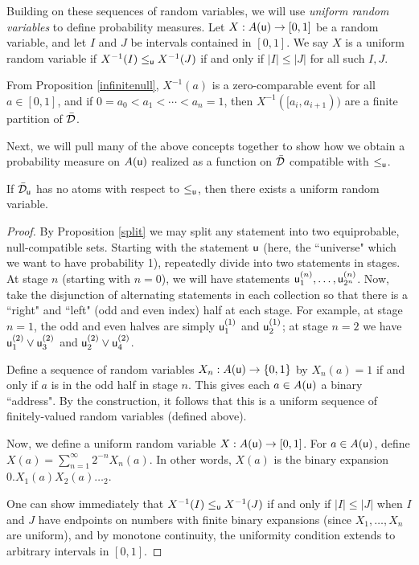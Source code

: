 \documentclass[10pt, onecolumn, longbibliography, nofootinbib]{revtex4-2}
\begin{document}
Building on these sequences of random variables, we will use \emph{uniform random variables} to define probability measures. Let $X:A({\stmt[u]})\to[0,1]$ be a random variable, and let $I$ and $J$ be intervals contained in $[0,1]$. We say $X$ is a uniform random variable if $X^{-1}(I)\lequ X^{-1}(J)$ if and only if $|I|\leq|J|$ for all such $I,J$. 

From Proposition \ref{infinitenull}, $X^{-1}(a)$ is a zero-comparable event for all $a\in[0,1]$, and if $0=a_0<a_1<\cdots<a_n=1$, then $X^{-1}([a_i,a_{i+1}))$ are a finite partition of $\tdomain$. 

Next, we will pull many of the above concepts together to show how we obtain a probability measure on $A({\stmt[u]})$ realized as a function on $\tdomain$ compatible with $\lequ$. 

\begin{prop}\label{uniformexist}
If $\tdomain_{\stmt[u]}$ has no atoms with respect to $\lequ$, then there exists a uniform random variable.
\end{prop}
\begin{proof}
By Proposition \ref{split} we may split any statement into two equiprobable, null-compatible sets. Starting with the statement $\stmt[u]$ (here, the ``universe" which we want to have probability 1), repeatedly divide into two statements in stages. At stage $n$ (starting with $n=0$), we will have statements $\stmt[u]^{(n)}_1,\ldots,\stmt[u]^{(n)}_{2^n}$. Now, take the disjunction of alternating statements in each collection so that there is a ``right" and ``left" (odd and even index) half at each stage. For example, at stage $n=1$, the odd and even halves are simply $\stmt[u]^{(1)}_1$ and $\stmt[u]^{(1)}_2$; at stage $n=2$ we have $\stmt[u]^{(2)}_1\OR\stmt[u]^{(2)}_3$ and $\stmt[u]^{(2)}_2\OR\stmt[u]^{(2)}_4$. 

Define a sequence of random variables $X_n:A(\stmt[u])\to\{0,1\}$ by $X_n(a) = 1$ if and only if $a$ is in the odd half in stage $n$. This gives each $a\in A(\stmt[u])$ a binary ``address". By the construction, it follows that this is a uniform sequence of finitely-valued random variables (defined above). 

Now, we define a uniform random variable $X:A(\stmt[u])\to[0,1]$. For $a\in A(\stmt[u])$, define $X(a) = \sum_{n=1}^{\infty}2^{-n}X_n(a)$. In other words, $X(a)$ is the binary expansion $0.X_1(a)X_2(a)\ldots_2$. 

One can show immediately that $X^{-1}(I)\lequ X^{-1}(J)$ if and only if $|I|\leq |J|$ when $I$ and $J$ have endpoints on numbers with finite binary expansions (since $X_1,\ldots,X_n$ are uniform), and by monotone continuity, the uniformity condition extends to arbitrary intervals in $[0,1]$. 
\end{proof}
\end{document}
